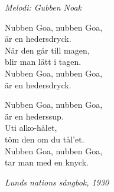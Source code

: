 {\footnotesize\textit{Melodi: Gubben Noak}}\par
\vspace{10pt}
Nubben Goa, nubben Goa,\\
är en hedersdryck.\\
När den går till magen,\\
blir man lätt i tagen.\\
Nubben Goa, nubben Goa,\\
är en hedersdryck.\par
\vspace{10pt}
Nubben Goa, nubben Goa,\\
är en hederssup.\\
Uti alko-hålet,\\
töm den om du tål'et.\\
Nubben Goa, nubben Goa,\\
tar man med en knyck.\par
\vspace{10pt}
{\footnotesize\textit{Lunds nations sångbok, 1930}}

